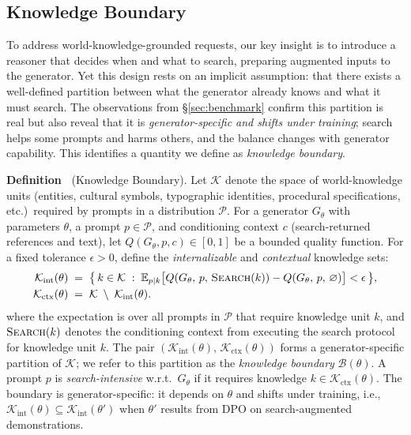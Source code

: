 \documentclass{article}
\newcounter{definitionctr}
\renewcommand{\thedefinitionctr}{\arabic{definitionctr}}
\begin{document}
\subsection{Knowledge Boundary}
To address world-knowledge-grounded requests, our key insight is to introduce a reasoner that decides when and what to search, preparing augmented inputs to the generator. Yet this design rests on an implicit assumption: that there exists a well-defined partition between what the generator already knows and what it must search. The observations from \S\ref{sec:benchmark} confirm this partition is real but also reveal that it is \emph{generator-specific and shifts under training}; search helps some prompts and harms others, and the balance changes with generator capability. This identifies a quantity we define as \emph{knowledge boundary}.

\begin{defbox} %
\textbf{Definition~\thedefinitionctr} (Knowledge Boundary).
\label{def:boundary}
Let $\mathcal{K}$ denote the space of world-knowledge units (entities, cultural symbols, typographic identities, procedural specifications, etc.)\ required by prompts in a distribution $\mathcal{P}$.
For a generator $G_\theta$ with parameters $\theta$, a prompt $p \in \mathcal{P}$, and conditioning context $c$ (search-returned references and text), let $Q(G_\theta, p, c) \in [0,1]$ be a bounded quality function.
For a fixed tolerance $\epsilon > 0$, define the \emph{internalizable} and \emph{contextual} knowledge sets:
\begin{align}
\mathcal{K}_{\mathrm{int}}(\theta) &\;=\; \bigl\{\, k \in \mathcal{K} \;:\; \mathbb{E}_{p \mid k}\bigl[Q(G_\theta,\, p,\, \text{\textsc{Search}}(k)) - Q(G_\theta,\, p,\, \varnothing)\bigr] < \epsilon \,\bigr\}, \label{eq:kint} \\
\mathcal{K}_{\mathrm{ctx}}(\theta) &\;=\; \mathcal{K} \;\setminus\; \mathcal{K}_{\mathrm{int}}(\theta). \label{eq:kctx}
\end{align}
where the expectation is over all prompts in $\mathcal{P}$ that require knowledge unit $k$, and $\text{\textsc{Search}}(k)$ denotes the conditioning context from executing the search protocol for knowledge unit $k$.
The pair $(\mathcal{K}_{\mathrm{int}}(\theta),\, \mathcal{K}_{\mathrm{ctx}}(\theta))$ forms a generator-specific partition of $\mathcal{K}$; we refer to this partition as the \emph{knowledge boundary} $\mathcal{B}(\theta)$.
A prompt $p$ is \emph{search-intensive} w.r.t.\ $G_\theta$ if it requires knowledge $k \in \mathcal{K}_{\mathrm{ctx}}(\theta)$.
The boundary is generator-specific: it depends on $\theta$ and shifts under training, i.e., $\mathcal{K}_{\mathrm{int}}(\theta) \subseteq \mathcal{K}_{\mathrm{int}}(\theta')$ when $\theta'$ results from DPO on search-augmented demonstrations.
\end{defbox}
\end{document}
